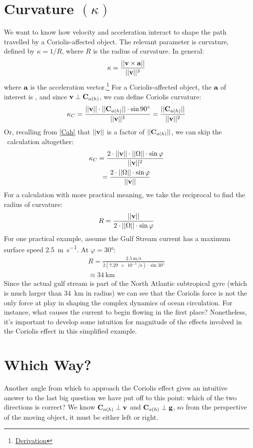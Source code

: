 \section{Curvature $(\kappa)$}
We want to know how velocity and acceleration interact to shape the path travelled by a Coriolis-affected object. The relevant parameter is curvature, defined by $\kappa=1/R$, where $R$ is the radius of curvature. In general:
\begin{equation}
\kappa=\frac{||\textbf{v}\times\textbf{a}||}{||\textbf{v}||^3}
\end{equation}
where $\textbf{a}$ is the acceleration vector.\footnote{\href{https://web.ma.utexas.edu/users/m408m/Display13-4-3.shtml}{Derivation}} For a Coriolis-affected object, the $\textbf{a}$ of interest is \vCah, and since $\textbf{v}\perp\textbf{C$_{a(h)}$}$, we can define Coriolis curvature:
\begin{equation}
\kappa_C=\frac{||\textbf{v}||\cdot||\textbf{C$_{a(h)}$}||\cdot\sin\ang{90}}{||\textbf{v}||^3}=\frac{||\textbf{C$_{a(h)}$}||}{||\textbf{v}||^2}
\end{equation}
Or, recalling from \cref{Cah} that $||\textbf{v}||$ is a factor of $||\textbf{C$_{a(h)}$}||$, we can skip the \vCah\ calculation altogether:
\begin{multline}
\kappa_C=\frac{2\cdot||\textbf{v}||\cdot||\Omega||\cdot\sin\varphi}{||\textbf{v}||^2}\\
=\frac{2\cdot||\Omega||\cdot\sin\varphi}{||\textbf{v}||}
\end{multline}
For a calculation with more practical meaning, we take the reciprocal to find the radius of curvature:
\begin{equation}
	R=\frac{||\textbf{v}||}{2\cdot||\Omega||\cdot\sin\varphi}
\end{equation}
For one practical example, assume the Gulf Stream current has a maximum surface speed \qty{2.5}{\meter\per\second}. At $\varphi=\ang{30}$:
\begin{multline}
R=\frac{\qty{2.5}{\meter\per\second}}{2\left(\qty{7.29e-5}{\per\second}\right)\cdot\sin\ang{30}}\\
\approx\qty{34}{\km}
\end{multline}
Since the actual gulf stream is part of the North Atlantic subtropical gyre (which is much larger than \qty{34}{\km} in radius) we can see that the Coriolis force is not the only force at play in shaping the complex dynamics of ocean circulation. For instance, what causes the current to begin flowing in the first place? Nonetheless, it's important to develop some intuition for magnitude of the effects involved in the Coriolis effect in this simplified example.
\section{Which Way?}
Another angle from which to approach the Coriolis effect gives an intuitive answer to the last big question we have put off to this point: which of the two directions is correct? We know $\textbf{C$_{a(h)}$}\perp\textbf{v}$ and $\textbf{C$_{a(h)}$}\perp\textbf{g}$, so from the perspective of the moving object, it must be either left or right.

